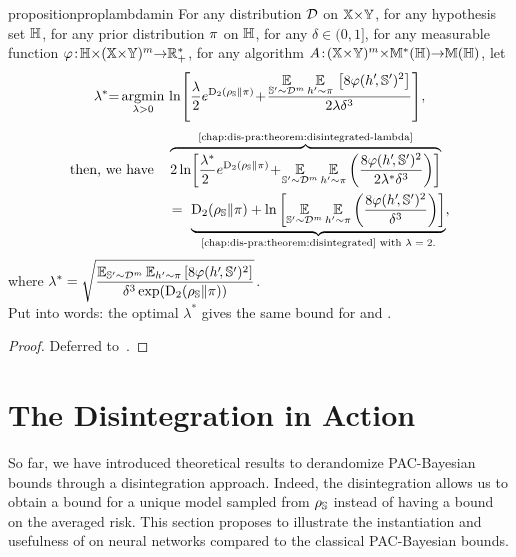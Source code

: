 \begin{restatable}{proposition}{proplambdamin}\label{chap:dis-pra:prop:lambda-min} For any distribution $\D$ on $\X{\times}\Y$, for any hypothesis set $\H$, for any prior distribution $\P$ on $\H$, for any $\delta{\in}(0,1]$, for any measurable function $\varphi\!:\! \H{\times}(\X{\times}\Y)^{\m}{\to} \Rbb_{+}^*$, for any algorithm $A\!:\!(\X{\times}\Y)^{\m}{\times}\M^{*}(\H){\to} \M(\H)$, let 
\begin{align*}
\lambda^* {=} \argmin_{\lambda>0} \, \ln\! \left[\frac{\lambda}{2} e^{\Renyi_{2}(\AQ\|\P)}\!+\!
\frac{\displaystyle \EE_{{\S'{\sim}\D^{\m}}} \EE_{\h'{\sim}\P}\,\LB8\varphi(\h'\!, \S')^2\RB}{2\lambda\delta^3}  \right]\!,
\end{align*}
\begin{align*}
\mbox{then, we have}\quad & \overbrace{2\ln\!\LB\frac{\lambda^*}{2\ }e^{\Renyi_{2}(\AQ\|\P)}\!+\! \EE_{\S'{\sim}\D^{\m}}\EE_{\h'{\sim} \P}
\LP\frac{8\varphi(\h'\!, \S')^2}{2\lambda^*\delta^3}\RP\RB}^{\text{\Cref{chap:dis-pra:theorem:disintegrated-lambda}}}   \\ &= \ \underbrace{\Renyi_{2}(\AQ\|\P) + \ln\LB\EE_{\S'{\sim}\D^{\m}}\EE_{\h'{\sim} \P}
\LP\frac{8\varphi(\h'\!, \S')^{2}}{\delta^3}\RP\RB}_{\text{\Cref{chap:dis-pra:theorem:disintegrated} with $\lambda=2$.} },
\end{align*}
where  $\displaystyle \lambda^* = \sqrt{\frac{\EE_{\S'{\sim}\D^{\m}}{\EE}_{{\h'{\sim}\P}}\LB8\varphi(\h'\!, \S')^2\RB}{\delta^3 \exp(\Renyi_{2}(\AQ\|\P))}}$. \\[1mm]
Put into words: the optimal $\lambda^*$ gives the same bound for  and .
\end{restatable}
\begin{noaddcontents}\begin{proof}
Deferred to~.
\end{proof}\end{noaddcontents}

\section{The Disintegration in Action}
\label{chap:dis-pra:sec:desintegration}

So far, we have introduced theoretical results to derandomize PAC-Bayesian bounds through a disintegration approach.
Indeed, the disintegration allows us to obtain a bound for a unique model sampled from $\AQ$ instead of having a bound on the averaged risk.
This section proposes to illustrate the instantiation and usefulness of  on neural networks compared to the classical PAC-Bayesian bounds.

